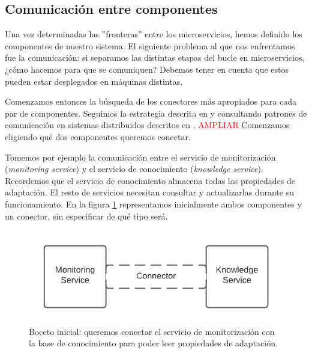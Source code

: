 \subsection{Comunicación entre componentes}

Una vez determinadas las ''fronteras'' entre los microservicios, hemos definido los componentes de nuestro sistema. El siguiente problema al que nos enfrentamos fue la comunicación: si separamos las distintas etapas del bucle en microservicios, ¿cómo hacemos para que se comuniquen? Debemos tener en cuenta que estos pueden estar desplegados en máquinas distintas.

Comenzamos entonces la búsqueda de los conectores más apropiados para cada par de componentes. Seguimos la estrategia descrita en \cite{taylorSoftwareArchitectureFoundations2009} y consultando patrones de comunicación en sistemas distribuidos descritos en \cite{newmanBuildingMicroservicesDesigning2021}. \textcolor{red}{AMPLIAR} Comenzamos eligiendo qué dos componentes queremos conectar.

Tomemos por ejemplo la comunicación entre el servicio de monitorización (\emph{monitoring service}) y el servicio de conocimiento (\emph{knowledge service}). Recordemos que el servicio de conocimiento almacena todas las propiedades de adaptación. El resto de servicios necesitan consultar y actualizarlas durante su funcionamiento. En la figura \ref{fig:monitor-knowledge-initial} representamos inicialmente ambos componentes y un conector, sin especificar de qué tipo será.

\begin{figure}[htb]
  \centering
  \includegraphics{02_arquitectura/images/Monitor-Knowledge-Initial-Connector}
  \caption{Boceto inicial: queremos conectar el servicio de monitorización con la base de conocimiento para poder leer propiedades de adaptación.}
  \label{fig:monitor-knowledge-initial}
\end{figure}

